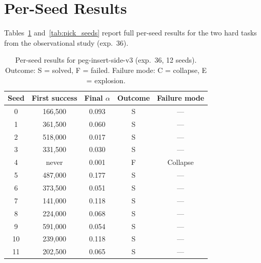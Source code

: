 \documentclass[twocolumn]{article}
\begin{document}
\clearpage
{}



\appendix

\section{Per-Seed Results}
\label{app:per_seed}

Tables~\ref{tab:peg_seeds} and~\ref{tab:pick_seeds} report full per-seed
results for the two hard tasks from the observational study (exp.~36).

\begin{table}[h]
\caption{Per-seed results for peg-insert-side-v3 (exp.~36, 12 seeds).
Outcome: S = solved, F = failed. Failure mode: C = collapse, E = explosion.}
\label{tab:peg_seeds}
\centering
\small
\begin{tabular}{ccccc}
\toprule
Seed & First success & Final $\alpha$ & Outcome & Failure mode \\
\midrule
0  & 166,500  & 0.093 & S & --- \\
1  & 361,500  & 0.060 & S & --- \\
2  & 518,000  & 0.017 & S & --- \\
3  & 331,500  & 0.030 & S & --- \\
4  & never    & 0.001 & F & Collapse \\
5  & 487,000  & 0.177 & S & --- \\
6  & 373,500  & 0.051 & S & --- \\
7  & 141,000  & 0.118 & S & --- \\
8  & 224,000  & 0.068 & S & --- \\
9  & 591,000  & 0.054 & S & --- \\
10 & 239,000  & 0.118 & S & --- \\
11 & 202,500  & 0.065 & S & --- \\
\bottomrule
\end{tabular}
\end{table}
\end{document}
